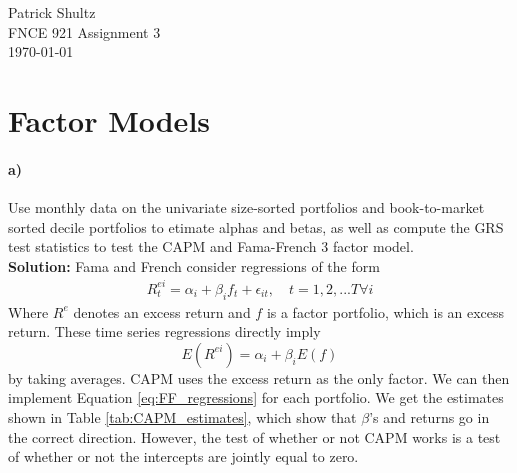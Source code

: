 \documentclass[french, 11pt]{article}
\begin{document}
\noindent Patrick Shultz\\
\noindent FNCE 921 Assignment 3\\
\today\\

\section{Factor Models}
\paragraph{a)} Use monthly data on the univariate size-sorted portfolios and book-to-market sorted decile portfolios to etimate alphas and betas, as well as compute the GRS test statistics to test the CAPM and Fama-French 3 factor model.\\

\noindent\textbf{Solution:} Fama and French consider regressions of the form
\begin{equation}
\begin{split}
R^{ei}_t = \alpha_{i} + \beta_i f_t + \epsilon_{it}, \quad t = 1, 2, ... T \forall i
\end{split}
\label{eq:FF_regressions}
\end{equation}
Where $R^e$ denotes an excess return and $f$ is a factor portfolio, which is an excess return. These time series regressions directly imply
\begin{equation*}
E(R^{ei}) = \alpha_{i} + \beta_i E(f)
\end{equation*}
by taking averages. CAPM uses the excess return as the only factor. We can then implement Equation \ref{eq:FF_regressions} for each portfolio. We get the estimates shown in Table \ref{tab:CAPM_estimates}, which show that $\beta$'s and returns go in the correct direction. However, the test of whether or not CAPM works is a test of whether or not the intercepts are jointly equal to zero. 
\end{document}
